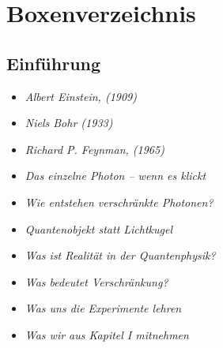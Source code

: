 \cleardoublepage
\renewcommand{\thechapter}{B}

\renewcommand{\thesection}{\Alph{chapter}.\arabic{section}}



\chapter{Boxenverzeichnis}
\label{anhangB}


\label{chap:boxenverzeichnis}
\thispagestyle{empty}



\section{Einführung}
\vspace{1em}
\begin{tcolorbox}[title=physikalische Boxen, physikbox]
\begin{itemize}
	\item \emph{Albert Einstein, (1909)}\dotfill \pageref{box:einstein1909}
	\item \emph{ Niels Bohr (1933)}\dotfill  \pageref{box:bohr1933}
	\item \emph{Richard P. Feynman, (1965)}\dotfill \pageref{box:feynman1965}
	\item \emph{Das einzelne Photon – wenn es klickt}\dotfill\pageref{box:einzelphoton}
	\item \emph{Wie entstehen verschränkte Photonen?}\dotfill \pageref{box:spdc}
\end{itemize}
\end{tcolorbox}

\vspace{1em}
\begin{tcolorbox}[title=didaktische Boxen,didaktikbox]
\begin{itemize}
		\item \emph{Quantenobjekt statt Lichtkugel} \dotfill\pageref{box:lichtkugel}
	\item \emph{Was ist Realität in der Quantenphysik?} \dotfill\pageref{box:realitaet}
	\item \emph{Was bedeutet Verschränkung?} \dotfill\pageref{box:verschr}
	\item \emph{Was uns die Experimente lehren} \dotfill\pageref{box:experimente}
	\item \emph{Was wir aus Kapitel I mitnehmen} \dotfill\pageref{box:kapitel1faz}
\end{itemize}
\end{tcolorbox}
